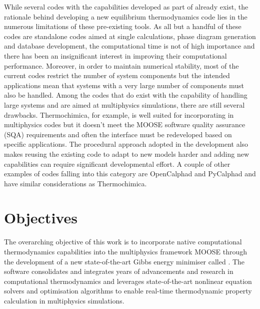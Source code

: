 	While several codes with the capabilities developed as part of {\GEM} already exist, the rationale behind developing a new equilibrium thermodynamics code lies in the numerous limitations of these pre-existing tools. As all but a handful of these codes are standalone codes aimed at single calculations, phase diagram generation and database development,  the computational time is not of high importance and there has been an insignificant interest in improving their computational performance. Moreover, in order to maintain numerical stability, most of the current codes restrict the number of system components but the intended applications mean that systems with a very large number of components must also be handled. Among the codes that do exist with the capability of handling large systems and are aimed at multiphysics simulations, there are still several drawbacks. Thermochimica, for example, is well suited for incorporating in multiphysics codes but it doesn't meet the MOOSE software quality assurance (SQA) requirements and often the interface must be redeveloped based on specific applications. The procedural approach adopted in the development also makes reusing the existing code to adapt to new models harder and adding new capabilities can require significant developmental effort. A couple of other examples of codes falling into this category are OpenCalphad and PyCalphad and have similar considerations as Thermochimica.  

\section{Objectives}
	The overarching objective of this work is to incorporate native computational thermodynamics capabilities into the multiphysics framework MOOSE through the development of a new state-of-the-art Gibbs energy minimiser called \GEM. The software consolidates and integrates years of advancements and research in computational thermodynamics and leverages state-of-the-art nonlinear equation solvers and optimisation algorithms to enable real-time thermodynamic property calculation in multiphysics simulations. 
	
